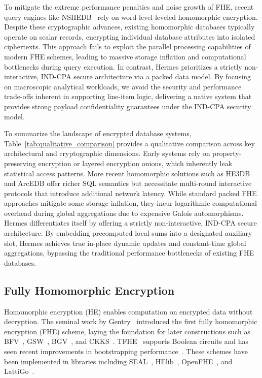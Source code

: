\documentclass[sigconf,nonacm]{acmart}
\begin{document}
To mitigate the extreme performance penalties and noise growth of FHE, recent query engines like NSHEDB~\cite{jung2026nshedbnoisesensitivehomomorphicencrypted} rely on word-level leveled homomorphic encryption. Despite these cryptographic advances, existing homomorphic databases typically operate on scalar records, encrypting individual database attributes into isolated ciphertexts. This approach fails to exploit the parallel processing capabilities of modern FHE schemes, leading to massive storage inflation and computational bottlenecks during query execution. In contrast, Hermes prioritizes a strictly non-interactive, IND-CPA secure architecture via a packed data model. By focusing on macroscopic analytical workloads, we avoid the security and performance trade-offs inherent in supporting line-item logic, delivering a native system that provides strong payload confidentiality guarantees under the IND-CPA security model.

To summarize the landscape of encrypted database systems, Table~\ref{tab:qualitative_comparison} provides a qualitative comparison across key architectural and cryptographic dimensions. Early systems rely on property-preserving encryption or layered encryption onions, which inherently leak statistical access patterns. More recent homomorphic solutions such as HE3DB and ArcEDB offer richer SQL semantics but necessitate multi-round interactive protocols that introduce additional network latency. While standard packed FHE approaches mitigate some storage inflation, they incur logarithmic computational overhead during global aggregations due to expensive Galois automorphisms. Hermes differentiates itself by offering a strictly non-interactive, IND-CPA secure architecture. By embedding precomputed local sums into a designated auxiliary slot, Hermes achieves true in-place dynamic updates and constant-time global aggregations, bypassing the traditional performance bottlenecks of existing FHE databases.

\subsection{Fully Homomorphic Encryption}
\label{sec:prelim-he}

Homomorphic encryption (HE) enables computation on encrypted data without decryption. The seminal work by Gentry~\cite{gentry2009} introduced the first fully homomorphic encryption (FHE) scheme, laying the foundation for later constructions such as BFV~\cite{FV2012,brakerski2012}, GSW~\cite{gsw13}, BGV~\cite{BGV2014}, and CKKS~\cite{ckks2016}.  TFHE~\cite{torusCircuit} supports Boolean circuits and has seen recent improvements in bootstrapping performance~\cite{IEEETfhe,Guimares2024MOSFHETOS}. These schemes have been implemented in libraries including SEAL~\cite{sealcrypto}, HElib~\cite{helib}, OpenFHE~\cite{openfhe}, and LattiGo~\cite{lattigo_github}.
\end{document}
